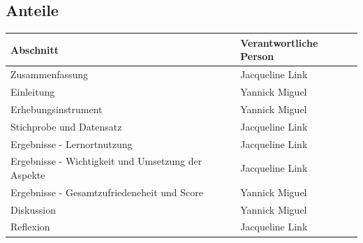 \documentclass[11pt, a4paper]{article}
\begin{document}
\newpage
\subsection{Anteile}
\begin{table}[h]
	\begin{tabular}{l|l}
		Abschnitt                                          & Verantwortliche Person \\ \hline
		Zusammenfassung                                    & Jacqueline Link        \\
		Einleitung                                         & Yannick Miguel         \\
		Erhebungsinstrument                                & Yannick Miguel         \\
		Stichprobe und Datensatz                           &
		Jacqueline Link        \\
		Ergebnisse - Lernortnutzung                        & Jacqueline Link        \\
		Ergebnisse - Wichtigkeit und Umsetzung der Aspekte & Jacqueline Link        \\
		Ergebnisse - Gesamtzufriedeneheit und Score        & Yannick Miguel         \\
		Diskussion                                         & Yannick Miguel         \\
		Reflexion                                          & Jacqueline Link       
	\end{tabular}
\end{table}
\end{document}

